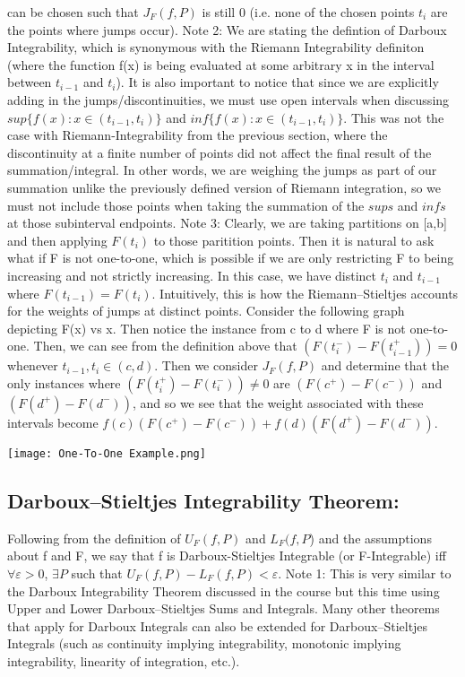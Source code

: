 \documentclass{report}
\begin{document}
can be chosen such that $J_F(f, P)$ is still 0 (i.e. none of the chosen points $t_i$ are the points where jumps occur).
\newline \newline
Note 2: We are stating the defintion of Darboux Integrability, which is 
synonymous with the Riemann Integrability definiton (where the 
function f(x) is being evaluated at some arbitrary x in the interval 
between \( t_{i-1} \) and \( t_i \)). It is also important to notice that since
we are explicitly adding in the jumps/discontinuities, we must use open intervals 
when discussing $sup\{f(x): x \in (t_{i-1}, t_i) \}$ and $inf\{f(x): x \in (t_{i-1}, t_i) \}$. This was not the case
with Riemann-Integrability from the previous section, where the discontinuity at a finite 
number of points did not affect the final result of the summation/integral. In other words, we are
weighing the jumps as part of our summation unlike the previously defined version of Riemann integration, 
so we must not include those points when taking the summation of the $sups$ and $infs$ at those subinterval endpoints. 
\newline \newline
Note 3: Clearly, we are taking partitions on [a,b] and then applying $F(t_i)$ to those
paritition points. Then it is natural to ask what if F is not one-to-one, which
is possible if we are only restricting F to being increasing and not strictly
increasing. In this case, we have distinct $t_i$ and $t_{i-1}$ where $F(t_{i-1}) = F(t_i)$.
Intuitively, this is how the Riemann–Stieltjes accounts for the weights of jumps at distinct points. 
Consider the following graph depicting F(x) vs x. Then notice the instance from 
c to d where F is not one-to-one. Then, we can see from the definition above that
$(F(t_i^-) - F(t_{i-1}^+)) = 0$ whenever $ t_{i-1}, t_{i} \in (c,d)$. Then we 
consider $J_F(f, P)$ and determine that the only instances where $(F(t_i^+) - F(t_i^-)) \neq 0$
are $(F(c^+) - F(c^-))$ and $(F(d^+) - F(d^-))$, and so we see that the weight associated
with these intervals become $f(c)(F(c^+) - F(c^-))+ f(d)(F(d^+) - F(d^-))$. 
\newline
\begin{center}
    \texttt{[image: One-To-One Example.png]}
\end{center}
\subsection{Darboux–Stieltjes Integrability Theorem:}
Following from the definition of $U_F(f, P)$ and $L_F(f, P$) and the
assumptions about f and F, we say that f is Darboux-Stieltjes Integrable
(or F-Integrable) iff $\forall \varepsilon>0$, $\exists P$
such that $U_F(f, P) - L_F(f, P) < \varepsilon$.
\newline \newline
Note 1: This is very similar to the Darboux Integrability Theorem discussed in the course
but this time using Upper and Lower Darboux–Stieltjes Sums and Integrals. Many other theorems 
that apply for Darboux Integrals can also be extended for Darboux–Stieltjes Integrals 
(such as continuity implying integrability, monotonic implying integrability, 
linearity of integration, etc.).
\end{document}
